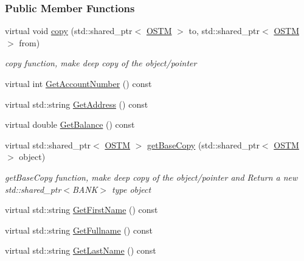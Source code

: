 \subsubsection*{Public Member Functions}
\begin{DoxyCompactItemize}
\item 
virtual void \hyperlink{class_u_l_s_t_e_r_aeef5c3e20f2a82344b4b83e5ccf4cc40_aeef5c3e20f2a82344b4b83e5ccf4cc40}{copy} (std\+::shared\+\_\+ptr$<$ \hyperlink{class_o_s_t_m}{O\+S\+TM} $>$ to, std\+::shared\+\_\+ptr$<$ \hyperlink{class_o_s_t_m}{O\+S\+TM} $>$ from)
\begin{DoxyCompactList}\small\item\em copy function, make deep copy of the object/pointer \end{DoxyCompactList}\item 
virtual int \hyperlink{class_u_l_s_t_e_r_a1ad672ae865a9f559bf4d3c33c243d63_a1ad672ae865a9f559bf4d3c33c243d63}{Get\+Account\+Number} () const 
\item 
virtual std\+::string \hyperlink{class_u_l_s_t_e_r_ac31a16a960e53ea592b0d809a3ba167d_ac31a16a960e53ea592b0d809a3ba167d}{Get\+Address} () const 
\item 
virtual double \hyperlink{class_u_l_s_t_e_r_ae70da9686ac038862900182a984e56eb_ae70da9686ac038862900182a984e56eb}{Get\+Balance} () const 
\item 
virtual std\+::shared\+\_\+ptr$<$ \hyperlink{class_o_s_t_m}{O\+S\+TM} $>$ \hyperlink{class_u_l_s_t_e_r_ad0c05e562b0c67283edfa4940c9aa728_ad0c05e562b0c67283edfa4940c9aa728}{get\+Base\+Copy} (std\+::shared\+\_\+ptr$<$ \hyperlink{class_o_s_t_m}{O\+S\+TM} $>$ object)
\begin{DoxyCompactList}\small\item\em get\+Base\+Copy function, make deep copy of the object/pointer and Return a new std\+::shared\+\_\+ptr$<$\+B\+A\+N\+K$>$ type object \end{DoxyCompactList}\item 
virtual std\+::string \hyperlink{class_u_l_s_t_e_r_a85ee4e42d9b309608d8dfbedac65ff27_a85ee4e42d9b309608d8dfbedac65ff27}{Get\+First\+Name} () const 
\item 
virtual std\+::string \hyperlink{class_u_l_s_t_e_r_abb93ac2163f908782d00cbae169ebb91_abb93ac2163f908782d00cbae169ebb91}{Get\+Fullname} () const 
\item 
virtual std\+::string \hyperlink{class_u_l_s_t_e_r_a9320b012bccda4ebf6b41c9ed972743c_a9320b012bccda4ebf6b41c9ed972743c}{Get\+Last\+Name} () const 
\item 

\end{DoxyCompactItemize}
